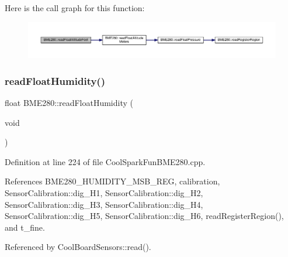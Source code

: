 Here is the call graph for this function\+:
\nopagebreak
\begin{figure}[H]
\begin{center}
\leavevmode
\includegraphics[width=350pt]{df/dcf/class_b_m_e280_a6525c8a26f887b52596c86bed99343cb_cgraph}
\end{center}
\end{figure}
\mbox{\label{class_b_m_e280_a42ea7232039eebf5aadb391ef6132c35}} 
\subsubsection{\texorpdfstring{read\+Float\+Humidity()}{readFloatHumidity()}}
{\footnotesize\ttfamily float B\+M\+E280\+::read\+Float\+Humidity (\begin{DoxyParamCaption}\item[{void}]{ }\end{DoxyParamCaption})}



Definition at line 224 of file Cool\+Spark\+Fun\+B\+M\+E280.\+cpp.



References B\+M\+E280\+\_\+\+H\+U\+M\+I\+D\+I\+T\+Y\+\_\+\+M\+S\+B\+\_\+\+R\+EG, calibration, Sensor\+Calibration\+::dig\+\_\+\+H1, Sensor\+Calibration\+::dig\+\_\+\+H2, Sensor\+Calibration\+::dig\+\_\+\+H3, Sensor\+Calibration\+::dig\+\_\+\+H4, Sensor\+Calibration\+::dig\+\_\+\+H5, Sensor\+Calibration\+::dig\+\_\+\+H6, read\+Register\+Region(), and t\+\_\+fine.



Referenced by Cool\+Board\+Sensors\+::read().

